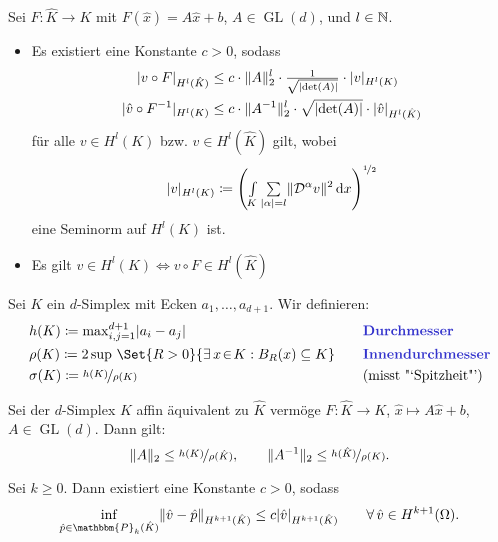 \documentclass{cheat-sheet}
\newcommand{\DO}{\mathcal{D}} %
\DeclareMathOperator{\GL}{GL}
\newcommand{\Poly}{\mathbbm{P}} %
\begin{document}
\begin{lem}
  Sei $F : \hat{K} \to K$ mit $F(\hat{x}) = A \hat{x} + b$, $A \in \GL(d)$, und $l \in \mathbb{N}$.
  \begin{itemize}
    \item Es existiert eine Konstante $c > 0$, sodass
    \begin{align*}
      \lvert v \circ F\rvert_{H^l(\hat{K})} & \leq c \cdot \lVert A\rVert_2^l \cdot \tfrac{1}{\sqrt{\lvert\det(A)\rvert}} \cdot \lvert v\rvert_{H^l(K)} \\
      \lvert\hat{v} \circ F^{-1}\rvert_{H^l(K)} & \leq c \cdot \lVert A^{-1}\rVert_2^l \cdot \sqrt{\lvert\det(A)\rvert} \cdot \lvert\hat{v}\rvert_{H^l(\hat{K})}
    \end{align*}
    für alle $v \in H^l(K)$ bzw. $\hat{v} \in H^l(\hat{K})$ gilt, wobei
    \[
      \abs{v}_{H^l(K)} \coloneqq \left( \Int{K}{}{\sum_{\abs{\alpha} = l} \norm{\DO^\alpha v}^2} {x}\right)^{\nicefrac{1}{2}}
    \]
    eine Seminorm auf $H^l(K)$ ist.
    \item Es gilt \enspace
    $v \in H^l(K) \iff v \circ F \in H^l(\hat{K})$
  \end{itemize}
\end{lem}


\begin{defn}
  Sei $K$ ein $d$-Simplex mit Ecken $a_1, \ldots, a_{d+1}$.
  Wir definieren:
  \begin{alignat*}{3}
    & h(K) \coloneqq {\max}_{i,j=1}^{d+1} \abs{a_i - a_j} &&
    \text{\emph{Durchmesser}} \\
    & \rho(K) \coloneqq 2 \sup \, \Set{R > 0}{\ex{x \!\in\! K\!}\! B_R(x) \subseteq K} \quad &&
    \text{\emph{Innendurchmesser}} \\
    & \sigma(K) \coloneqq \nicefrac{h(K)}{\rho(K)} &&
    \text{(misst "`Spitzheit"')}
  \end{alignat*}
\end{defn}

\begin{lem}
  Sei der $d$-Simplex $K$ affin äquivalent zu $\hat{K}$ vermöge $F : \hat{K} \to K$, \enspace $\hat{x} \mapsto A \hat{x} + b$, $A \in \GL(d)$.
  Dann gilt:
  \[
    \lVert A\rVert_2 \leq \nicefrac{h(K)}{\rho(\hat{K})}, \qquad
    \lVert A^{-1}\rVert_2 \leq \nicefrac{h(\hat{K})}{\rho(K)}.
  \]
\end{lem}

\begin{lem}
  Sei $k \geq 0$.
  Dann existiert eine Konstante $c > 0$, sodass
  \[
    \inf_{\hat{p} \in \Poly_k(\hat{K})} \norm{\hat{v} - \hat{p}}_{H^{k+1}(\hat{K})} \leq c \abs{\hat{v}}_{H^{k+1}(\hat{K})} \qquad
    \forall \, \hat{v} \in H^{k+1}(\Omega).
  \]
\end{lem}
\end{document}
